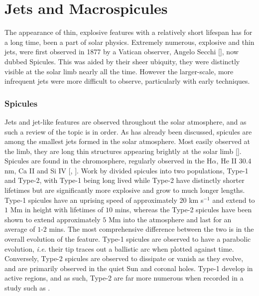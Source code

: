 



\chapter{Jets and Macrospicules}
\label{ch:2}



The appearance of thin, explosive features with a relatively short lifespan has for a long time, been a part of solar physics.
Extremely numerous, explosive and thin jets, were first observed in 1877 by a Vatican observer, Angelo Secchi [\cite{Lang2009}], now dubbed Spicules.
This was aided by their sheer ubiquity, they were distinctly visible at the solar limb nearly all the time.
However the larger-scale, more infrequent jets were more difficult to observe, particularly with early techniques.

\subsection{Spicules}
Jets and jet-like features are observed throughout the solar atmosphere, and as such a review of the topic is in order.
As has already been discussed, spicules are among the smallest jets formed in the solar atmosphere. 
Most easily observed at the limb, they are long thin structures appearing brightly at the solar limb [\cite{Beckers1972}].
Spicules are found in the chromosphere, regularly observed in the H$\alpha$, He II $30.4$ nm, Ca II and Si IV [\cite{Sterling2000}, \cite{Tsiropoula2012}].
Work by \cite{DePontieu2007} divided spicules into two populations, Type-1 and Type-2, with Type-1 being long lived while Type-2 have distinctly shorter lifetimes but are significantly more explosive and grow to much longer lengths.
Type-1 spicules have an uprising speed of approximately $20$ km s$^{-1}$ and extend to $1$ Mm in height with lifetimes of $10$ mins, whereas the Type-2 spicules have been shown to extend approximately $5$ Mm into the atmosphere and last for an average of $1$-$2$ mins. 
The most comprehensive difference between the two is in the overall evolution of the feature.
Type-1 spicules are observed to have a parabolic evolution, \emph{i.e.} their tip traces out a ballistic arc when plotted against time.
Conversely, Type-2 spicules are observed to dissipate or vanish as they evolve, and are primarily observed in the quiet Sun and coronal holes.
Type-1 develop in active regions, and as such, Type-2 are far more numerous when recorded in a study such as \cite{Pereira2012}.

